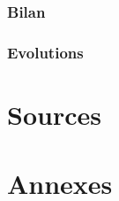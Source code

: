 \documentclass{article}
\begin{document}
\newpage


\section{Bilan}\label{sec:bilan}

\newpage


\section{Evolutions}

\newpage


\part*{Sources}

\newpage


\part*{Annexes}

\newpage
\end{document}
